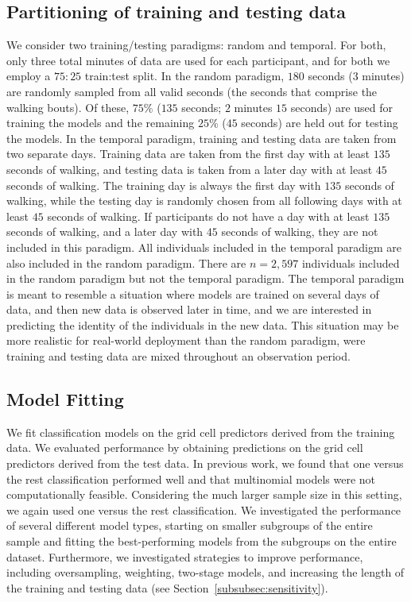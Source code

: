 \subsection{Partitioning of training and testing data}\label{subsec:partitions}
We consider two training/testing paradigms: random and temporal. For both, only three total minutes of data are used for each participant, and for both we employ a $75:25$ train:test split. In the random paradigm, $180$ seconds ($3$ minutes) are randomly sampled from all valid seconds (the seconds that comprise the walking bouts). Of these, $75$\% ($135$ seconds; $2$ minutes $15$ seconds) are used for training the models and the remaining $25$\% ($45$ seconds) are held out for testing the models. In the temporal paradigm, training and testing data are taken from two separate days. Training data are taken from the first day with at least $135$ seconds of walking, and testing data is taken from a later day with at least $45$ seconds of walking. The training day is always the first day with $135$ seconds of walking, while the testing day is randomly chosen from all following days with at least $45$ seconds of walking. If participants do not have a day with at least $135$ seconds of walking, and a later day with $45$ seconds of walking, they are not included in this paradigm. All individuals included in the temporal paradigm are also included in the random paradigm. There are $n = 2{,}597$ individuals included in the random paradigm but not the temporal paradigm. The temporal paradigm is meant to resemble a situation where models are trained on several days of data, and then new data is observed later in time, and we are interested in predicting the identity of the individuals in the new data. This situation may be more realistic for real-world deployment than the random paradigm, were training and testing data are mixed throughout an observation period. 


\subsection{Model Fitting}
We fit classification models on the grid cell predictors derived from the training data. We evaluated performance by obtaining predictions on the grid cell predictors derived from the test data. In previous work, we found that one versus the rest classification performed well and that multinomial models were not computationally feasible. Considering the much larger sample size in this setting, we again used one versus the rest classification.  We investigated the performance of several different model types, starting on smaller subgroups of the entire sample and fitting the best-performing models from the subgroups on the entire dataset. Furthermore, we investigated strategies to improve performance, including oversampling, weighting, two-stage models, and increasing the length of the training and testing data (see Section~\ref{subsubsec:sensitivity}).

